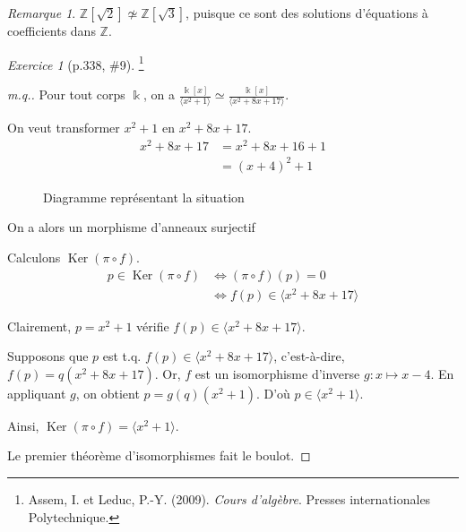 \documentclass{report}
\theoremstyle{definition}
\theoremstyle{remark}
\newtheorem*{exer}{Exercice}
\newtheorem*{rmq}{Remarque}
\def\ZZ{\mathbb{Z}}
\def\noyau{\operatorname{Ker}}
\begin{document}
	\begin{rmq}
		$\ZZ[\sqrt{2}] \not\simeq \ZZ[\sqrt{3}]$, puisque ce sont des solutions d'\'equations \`a coefficients dans $\ZZ$.
	\end{rmq}

	\begin{exer}[p.338, \#9]\footnote{Assem, I. et Leduc, P.-Y. (2009). \textit{Cours d'alg\`ebre}. Presses internationales Polytechnique.}
		\begin{proof}[m.q.]
			Pour tout corps $\Bbbk$, on a $\frac{\Bbbk[x]}{\langle x^2+1 \rangle} \simeq \frac{\Bbbk[x]}{\langle x^2+8x+17 \rangle}$.

			On veut transformer $x^2+1$ en $x^2+8x+17$.
			\begin{align*}
				x^2+8x+17&= x^2+8x+16+1\\
				&= (x+4)^2+1
			\end{align*}
			\begin{figure}[h]
				\centering
				\caption{Diagramme repr\'esentant la situation}
			\end{figure}

			On a alors un morphisme d'anneaux surjectif 

			Calculons $\noyau(\pi\circ f)$.
			\begin{align*}
				p\in\noyau(\pi\circ f)&\Leftrightarrow (\pi\circ f)(p)=0\\
				&\Leftrightarrow f(p) \in \langle x^2+8x+17 \rangle
			\end{align*}

			Clairement, $p=x^2+1$ v\'erifie $f(p) \in \langle x^2+8x+17 \rangle$.

			Supposons que $p$ est t.q. $f(p) \in \langle x^2+8x+17 \rangle$, c'est-\`a-dire, $f(p)=q(x^2+8x+17)$. Or, $f$ est un isomorphisme d'inverse $g:x\mapsto x-4$. En appliquant $g$, on obtient $p=g(q)(x^2+1)$. D'o\`u $p\in\langle x^2+1 \rangle$.

			Ainsi, $\noyau(\pi\circ f)=\langle x^2+1 \rangle$.

			Le premier th\'eor\`eme d'isomorphismes fait le boulot.
		\end{proof}
	\end{exer}
\end{document}
